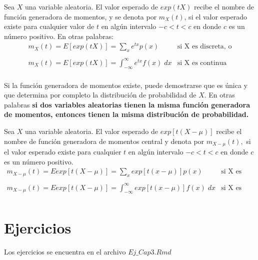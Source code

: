 \begin{tcolorbox}[colframe = white]
    \begin{def.}
	Sea $X$ una variable aleatoria. El valor esperado de $exp(tX)$ recibe el nombre de función generadora de momentos, y se denota por $m_X(t)$, si el valor esperado existe para cualquier valor de $t$ en algún intervalo $-c<t<c$ en donde $c$ es un número positivo. En otras palabras:
	$$\begin{array}{ll}
	    m_X(t) = E[exp(tX)] = \sum\limits_x e^{tx} p(x) & \mbox{si X es discreta, o}\\\\
	    m_X(t) = E[exp(tX)] = \displaystyle\int_{-\infty}^\infty e^{tx} f(x) \; dx & \mbox{si X es continua}\\
	\end{array}$$
    \end{def.}
\end{tcolorbox}
Si la función generadora de momentos existe, puede demostrarse que es única y que determina por completo la distribución de probabilidad de $X$. En otras palabras \textbf{si dos variables aleatorias tienen la misma función generadora de momentos, entonces tienen la misma distribución de probabilidad.}

\begin{tcolorbox}[colframe = white]
    \begin{def.}
	Sea $X$ una variable aleatoria. El valor esperado de $exp[t(X-\mu)]$ recibe el nombre de función generadora de momentos central y denota por $m_{X-\mu}(t),$ si el valor esperado existe para cualquier $t$ en algún intervalo $-c<t<c$ en donde $c$ es un número positivo.
	$$\begin{array}{ll}
	    m_{X-\mu}(t) = E{exp[t(X-\mu)]} = \sum\limits_x exp[t(x-\mu)] p(x) & \mbox{si X es discreta, o}\\\\
	    m_{X-\mu}(t) = E{exp[t(X-\mu)]} = \displaystyle\int_{-\infty}^\infty exp[t(x-\mu)] f(x) \; dx & \mbox{si X es continua}\\
	\end{array}$$
    \end{def.}
\end{tcolorbox}









\section{Ejercicios}

Los ejercicios se encuentra en el archivo $Ej\_Cap3.Rmd$


